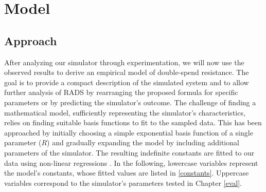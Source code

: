 \documentclass[a4paper,12pt,twoside]{report}
\begin{document}

\chapter{Model} \label{modelchapter}
\section{Approach}
After analyzing our simulator through experimentation, we will now use the observed results to derive an empirical model of double-spend resistance. The goal is to provide a compact description of the simulated system and to allow further analysis of RADS by rearranging the proposed formula for specific parameters or by predicting the simulator's outcome. The challenge of finding a mathematical model, sufficiently representing the simulator's characteristics, relies on finding suitable basis functions to fit to the sampled data. This has been approached by initially choosing a simple exponential basis function of a single parameter ($R$) and gradually expanding the model by including additional parameters of the simulator.  The resulting indefinite constants are fitted to our data using non-linear regressions \cite{nlxb}. In the following, lowercase variables represent the model's constants, whose fitted values are listed in \autoref{constants}. Uppercase variables correspond to the simulator's parameters tested in Chapter \ref{eval}. 
\end{document}
